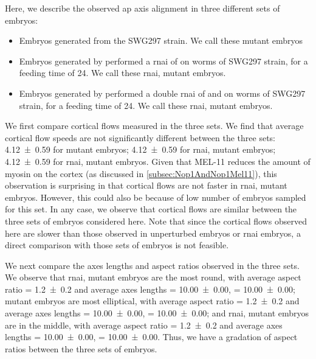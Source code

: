 Here, we describe the observed \ac{ap} axis alignment in three different sets of embryos:
\begin{itemize}
    \item Embryos generated from the SWG297 strain. We call these  mutant embryos
    \item Embryos generated by performed a \ac{rnai} of  on worms of SWG297 strain, for a feeding time of \SI{24}{\unitRNAiTime}. We call these  \ac{rnai},  mutant embryos.
    \item Embryos generated by performed a double \ac{rnai} of  and  on worms of SWG297 strain, for a feeding time of \SI{24}{\unitRNAiTime}. We call these  \ac{rnai},  mutant embryos.
\end{itemize}
We first compare cortical flows measured in the three sets. We find that average cortical flow speeds are not significantly different between the three sets: \SI{4.12 +- 0.59}{\unitCrtxVel} for  mutant embryos; \SI{4.12 +- 0.59}{\unitCrtxVel} for  \ac{rnai},  mutant embryos; \SI{4.12 +- 0.59}{\unitCrtxVel} for  \ac{rnai},  mutant embryos. Given that MEL-11 reduces the amount of myosin on the cortex (as discussed in \autoref{subsec:Nop1AndNop1Mel11}), this observation is surprising in that cortical flows are not faster in  \ac{rnai},  mutant embryos. However, this could also be because of low number of embryos sampled for this set. In any case, we observe that cortical flows are similar between the three sets of embryos considered here. Note that since the cortical flows observed here are slower than those observed in unperturbed embryos or  \ac{rnai} embryos, a direct comparison with those sets of embryos is not feasible.

We next compare the axes lengths and aspect ratios observed in the three sets. We observe that  \ac{rnai},  mutant embryos are the most round, with average aspect ratio \aspectRatio = \num{1.2 +- 0.2} and average axes lengths \longAxisLength = \SI{10.00 +- 0.00}{\unitLength}, \shortAxisLength = \SI{10.00 +- 0.00}{\unitLength};  mutant embryos are most elliptical, with average aspect ratio \aspectRatio = \num{1.2 +- 0.2} and average axes lengths \longAxisLength = \SI{10.00 +- 0.00}{\unitLength}, \shortAxisLength = \SI{10.00 +- 0.00}{\unitLength}; and  \ac{rnai},  mutant embryos are in the middle, with average aspect ratio \aspectRatio = \num{1.2 +- 0.2} and average axes lengths \longAxisLength = \SI{10.00 +- 0.00}{\unitLength}, \shortAxisLength = \SI{10.00 +- 0.00}{\unitLength}. Thus, we have a gradation of aspect ratios between the three sets of embryos.

